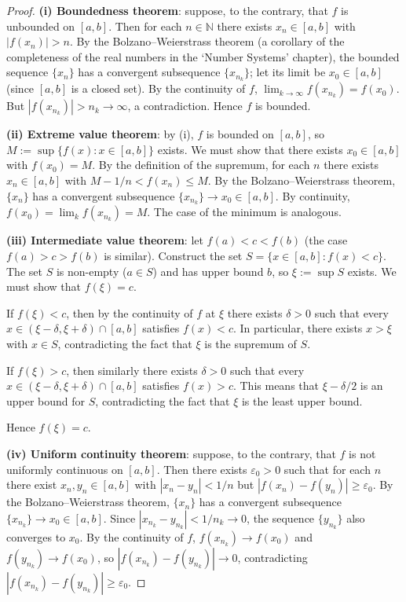 \begin{proof}
\textbf{(i) Boundedness theorem}: suppose, to the contrary, that $f$ is unbounded on $[a,b]$. Then for each $n \in \mathbb{N}$ there exists $x_n \in [a,b]$ with $|f(x_n)| > n$. By the Bolzano--Weierstrass theorem (a corollary of the completeness of the real numbers in the `Number Systems' chapter), the bounded sequence $\{x_n\}$ has a convergent subsequence $\{x_{n_k}\}$; let its limit be $x_0 \in [a,b]$ (since $[a,b]$ is a closed set). By the continuity of $f$, $\lim_{k\to\infty} f(x_{n_k}) = f(x_0)$. But $|f(x_{n_k})| > n_k \to \infty$, a contradiction. Hence $f$ is bounded.

\textbf{(ii) Extreme value theorem}: by (i), $f$ is bounded on $[a,b]$, so $M := \sup\{f(x) : x \in [a,b]\}$ exists. We must show that there exists $x_0 \in [a,b]$ with $f(x_0) = M$. By the definition of the supremum, for each $n$ there exists $x_n \in [a,b]$ with $M - 1/n < f(x_n) \le M$. By the Bolzano--Weierstrass theorem, $\{x_n\}$ has a convergent subsequence $\{x_{n_k}\} \to x_0 \in [a,b]$. By continuity, $f(x_0) = \lim_{k} f(x_{n_k}) = M$. The case of the minimum is analogous.

\textbf{(iii) Intermediate value theorem}: let $f(a) < c < f(b)$ (the case $f(a) > c > f(b)$ is similar). Construct the set $S = \{x \in [a,b] : f(x) < c\}$. The set $S$ is non-empty ($a \in S$) and has upper bound $b$, so $\xi := \sup S$ exists. We must show that $f(\xi) = c$.

If $f(\xi) < c$, then by the continuity of $f$ at $\xi$ there exists $\delta > 0$ such that every $x \in (\xi-\delta, \xi+\delta) \cap [a,b]$ satisfies $f(x) < c$. In particular, there exists $x > \xi$ with $x \in S$, contradicting the fact that $\xi$ is the supremum of $S$.

If $f(\xi) > c$, then similarly there exists $\delta > 0$ such that every $x \in (\xi-\delta, \xi+\delta) \cap [a,b]$ satisfies $f(x) > c$. This means that $\xi - \delta/2$ is an upper bound for $S$, contradicting the fact that $\xi$ is the least upper bound.

Hence $f(\xi) = c$.

\textbf{(iv) Uniform continuity theorem}: suppose, to the contrary, that $f$ is not uniformly continuous on $[a,b]$. Then there exists $\varepsilon_0 > 0$ such that for each $n$ there exist $x_n, y_n \in [a,b]$ with $|x_n - y_n| < 1/n$ but $|f(x_n) - f(y_n)| \ge \varepsilon_0$. By the Bolzano--Weierstrass theorem, $\{x_n\}$ has a convergent subsequence $\{x_{n_k}\} \to x_0 \in [a,b]$. Since $|x_{n_k} - y_{n_k}| < 1/n_k \to 0$, the sequence $\{y_{n_k}\}$ also converges to $x_0$. By the continuity of $f$, $f(x_{n_k}) \to f(x_0)$ and $f(y_{n_k}) \to f(x_0)$, so $|f(x_{n_k}) - f(y_{n_k})| \to 0$, contradicting $|f(x_{n_k}) - f(y_{n_k})| \ge \varepsilon_0$.
\end{proof}

